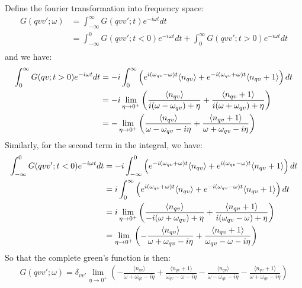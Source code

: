 \documentclass{article}
\begin{document}
Define the fourier transformation into frequency space:
\begin{align}
    G(qvv';\omega) &= \int_{-\infty}^{\infty} G(qvv';t) e^{-i\omega t} dt \\
            & = \int_{-\infty}^{0} G(qvv';t < 0) e^{-i\omega t} dt + \int_{0}^{\infty} G(qvv';t > 0) e^{-i\omega t} dt \\
\end{align}
and we have:
\begin{align}
    \int_{0}^{\infty} G(qv;t > 0) e^{-i\omega t} dt 
    &= -i \int_{0}^{\infty} \left( e^{i(\omega_{qv}-\omega)t}\langle n_{qv} \rangle + e^{-i(\omega_{qv}+\omega)t}\langle n_{qv}+1 \rangle \right) dt \notag \\
    &= -i \lim_{\eta \to 0^{+}} \left( \frac{\langle n_{qv} \rangle}{i(\omega - \omega_{qv}) + \eta} + \frac{\langle n_{qv}+1 \rangle}{i(\omega + \omega_{qv}) + \eta} \right) \notag \\
    &= - \lim_{\eta \to 0^{+}} \left( \frac{\langle n_{qv} \rangle}{\omega - \omega_{qv} - i\eta} + \frac{\langle n_{qv}+1 \rangle}{\omega + \omega_{qv} - i\eta} \right)
\end{align}
Similarly, for the second term in the integral, we have:
\begin{align}
    \int_{-\infty}^{0} G(qvv';t < 0) e^{-i\omega t} dt
    & = -i \int_{-\infty}^{0} \left( e^{-i(\omega_{qv}+\omega)t}\langle n_{qv} \rangle + e^{i(\omega_{qv}-\omega)t}\langle n_{qv}+1 \rangle \right) dt \notag \\
    & = i \int_{0}^{\infty} \left( e^{i(\omega_{qv}+\omega)t}\langle n_{qv} \rangle + e^{-i(\omega_{qv}-\omega)t}\langle n_{qv}+1 \rangle \right) dt \notag \\
    & = i \lim_{\eta \to 0^{+}} \left( \frac{\langle n_{qv} \rangle}{-i(\omega + \omega_{qv}) + \eta} + \frac{\langle n_{qv}+1 \rangle}{i(\omega_{qv} - \omega) + \eta} \right) \notag \\
    & = \lim_{\eta \to 0^{+}} \left( - \frac{\langle n_{qv} \rangle}{\omega + \omega_{qv} -i\eta} + \frac{\langle n_{qv}+1 \rangle}{\omega_{qv} - \omega -i\eta} \right)
\end{align}
So that the complete green's function is then:
\begin{align}
    G(qvv';\omega) = \delta_{vv'} \lim_{\eta \to 0^{+}} 
    \left( - \frac{\langle n_{qv} \rangle}{\omega + \omega_{qv} -i\eta} + \frac{\langle n_{qv}+1 \rangle}{\omega_{qv} - \omega -i\eta} - \frac{\langle n_{qv} \rangle}{\omega - \omega_{qv} - i\eta} - \frac{\langle n_{qv}+1 \rangle}{\omega + \omega_{qv} - i\eta} \right)
\end{align}
\end{document}
